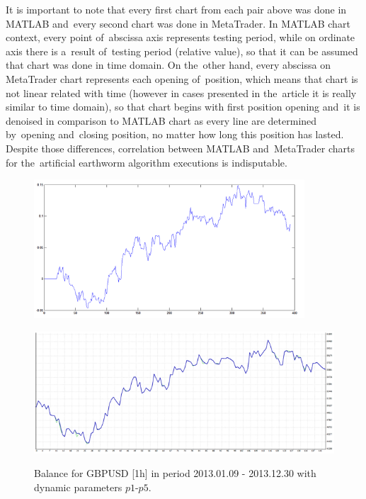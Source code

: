 \documentclass[runningheads,a4paper]{llncs}
\begin{document}
\FloatBarrier
\vspace{-1em}
It is important to note that every first chart from each pair above was done in MATLAB and~every second chart was done in MetaTrader. In MATLAB chart context, every point of~abscissa axis represents testing period, while on ordinate axis there is a~result of~testing period (relative value), so that it can be assumed that chart was done in time domain. On the~other hand, every abscissa on MetaTrader chart represents each opening of~position, which means that chart is not linear related with time (however in cases presented in the~article it is really similar to time domain), so that chart begins with first position opening and~it is denoised in comparison to MATLAB chart as every line are determined by~opening and~closing position, no matter how long this position has lasted. Despite those differences, correlation between MATLAB and~MetaTrader charts for the~artificial earthworm algorithm executions is indisputable.
\begin{figure}[h!]
\begin{minipage}{0.49\textwidth}
\centering
\includegraphics[width = 0.9\textwidth]{figures/rys14.png}
\label{fig:fig14}
\end{minipage}
\begin{minipage}{0.49\textwidth}
\centering
\includegraphics[width = \textwidth]{figures/rys15.png}
\label{fig:fig15}
\end{minipage}
\caption{Balance for GBPUSD [1h] in period 2013.01.09 - 2013.12.30 with dynamic parameters $p1$-$p5$.}
\end{figure}
\FloatBarrier
\vspace{-1em}
\end{document}
